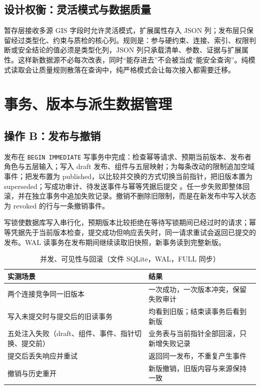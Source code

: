 \documentclass[a4paper,11pt,UTF8]{ctexart}
\begin{document}
\subsection{设计权衡：灵活模式与数据质量}

暂存层接收多源 GIS 字段时允许灵活模式，扩展属性存入 JSON 列；发布层只保留经过类型化、约束与质检的核心列。规则是：参与硬约束、连接、索引、权限判断或安全结论的值必须是类型化列，JSON 列只承载清单、参数、证据与扩展属性。这样新数据源不必每次改表，同时“能存进去”不会被当成“能安全查询”。纯模式读取会让质量规则散落在查询中，纯严格模式会让每次接入都需要迁移。

\section{事务、版本与派生数据管理}\label{sec:txn}

\subsection{操作 B：发布与撤销}

发布在 \texttt{BEGIN IMMEDIATE} 写事务中完成：检查幂等请求、预期当前版本、发布者角色与五层输入；写入 draft 发布、组件与五层映射；为每条改动的限制追加空域事件；把发布置为 published，以比较并交换的方式切换当前指针，把旧版本置为 superseded；写成功审计、待发送事件与幂等凭据后提交 \cite{sqlite-txn,sqlite-iso}。任一步失败即整体回滚，并在独立事务中追加失败记录。撤销不删除旧限制，而是在新发布中写入状态为 revoked 的行与一条撤销事件。

写锁使数据库写入串行化，预期版本比较拒绝在等待写锁期间已经过时的请求；幂等凭据先于当前版本检查，提交成功但响应丢失时，同一请求重试会返回已提交的发布。WAL 读事务在发布期间继续读取旧快照，新事务读到完整新版。

\begin{table}[!htbp]\centering\small
\caption{并发、可见性与回滚（文件 SQLite，WAL，FULL 同步）}
\begin{tabularx}{\textwidth}{L{5.2cm}Y}
\toprule
实测场景 & 结果 \\
\midrule
两个连接竞争同一旧版本 & 一次成功，一次版本冲突，保留失败审计 \\
写入未提交时与提交后的旧读事务 & 均看到旧版；结束读事务后看到新版 \\
五处注入失败（draft、组件、事件、指针切换、提交前） & 业务表与当前指针全部回滚，只新增失败记录 \\
提交后丢失响应并重试 & 返回同一发布，不重复产生事件 \\
撤销与历史重开 & 新版撤销，旧版内容与来源保持一致 \\
\bottomrule
\end{tabularx}
\end{table}
\end{document}
